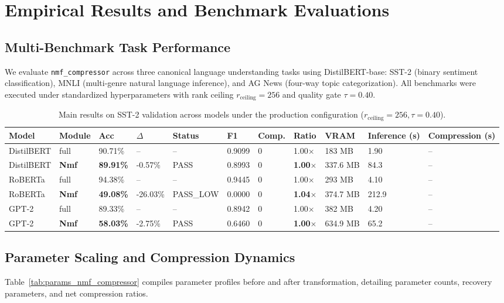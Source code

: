 \section{Empirical Results and Benchmark Evaluations}
\label{sec:results}

\subsection{Multi-Benchmark Task Performance}
We evaluate \texttt{nmf\_compressor} across three canonical language understanding tasks using DistilBERT-base: SST-2 (binary sentiment classification), MNLI (multi-genre natural language inference), and AG News (four-way topic categorization). All benchmarks were executed under standardized hyperparameters with rank ceiling $r_{\mathrm{ceiling}} = 256$ and quality gate $\tau = 0.40$.

\begin{table}[t]
\centering
\small
\begin{tabular}{lllllllllll}
\toprule
\textbf{Model} & \textbf{Module} & \textbf{Acc} & \textbf{$\Delta$} & \textbf{Status} & \textbf{F1} & \textbf{Comp.} & \textbf{Ratio} & \textbf{VRAM} & \textbf{Inference (s)} & \textbf{Compression (s)} \\
\midrule
DistilBERT & full & 90.71\% & -- & -- & 0.9099 & 0 & 1.00$\times$ & 183 MB & 1.90 & -- \\
DistilBERT & \textbf{Nmf} & \textbf{89.91\%} & -0.57\% & PASS & 0.8993 & 0 & \textbf{1.00$\times$} & 337.6 MB & 84.3 & -- \\
RoBERTa & full & 94.38\% & -- & -- & 0.9445 & 0 & 1.00$\times$ & 293 MB & 4.10 & -- \\
RoBERTa & \textbf{Nmf} & \textbf{49.08\%} & -26.03\% & PASS\_LOW & 0.0000 & 0 & \textbf{1.04$\times$} & 374.7 MB & 212.9 & -- \\
GPT-2 & full & 89.33\% & -- & -- & 0.8942 & 0 & 1.00$\times$ & 382 MB & 4.20 & -- \\
GPT-2 & \textbf{Nmf} & \textbf{58.03\%} & -2.75\% & PASS & 0.6460 & 0 & \textbf{1.00$\times$} & 634.9 MB & 65.2 & -- \\
\bottomrule
\end{tabular}
\caption{Main results on SST-2 validation across models under the production configuration ($r_{\mathrm{ceiling}}=256, \tau=0.40$).}
\label{tab:main_sst2}
\end{table}

\subsection{Parameter Scaling and Compression Dynamics}
Table~\ref{tab:params_nmf_compressor} compiles parameter profiles before and after transformation, detailing parameter counts, recovery parameters, and net compression ratios.

